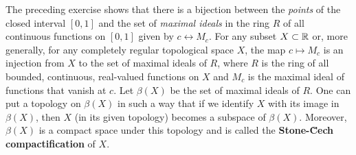 \documentclass[../psets.tex]{subfiles}
\begin{document}
The preceding exercise shows that there is a bijection between the \emph{points} of the closed interval $[0,1]$ and the set of \emph{maximal ideals} in the ring $R$ of all continuous functions on $[0,1]$ given by $c\leftrightarrow M_c$. For any subset $X\subset\mathbb{R}$ or, more generally, for any completely regular topological space $X$, the map $c\mapsto M_c$ is an injection from $X$ to the set of maximal ideals of $R$, where $R$ is the ring of all bounded, continuous, real-valued functions on $X$ and $M_c$ is the maximal ideal of functions that vanish at $c$. Let $\beta(X)$ be the set of maximal ideals of $R$. One can put a topology on $\beta(X)$ in such a way that if we identify $X$ with its image in $\beta(X)$, then $X$ (in its given topology) becomes a subspace of $\beta(X)$. Moreover, $\beta(X)$ is a compact space under this topology and is called the \textbf{Stone-\u{C}ech compactification} of $X$.
\end{document}
